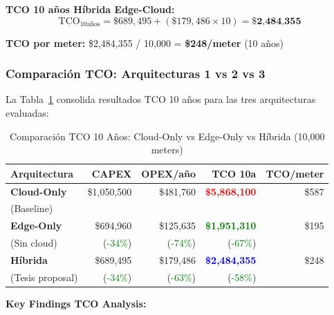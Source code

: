\textbf{TCO 10 años Híbrida Edge-Cloud:}
\begin{equation}
\text{TCO}_{10\text{años}} = \$689,495 + (\$179,486 \times 10) = \textbf{\$2,484,355}
\end{equation}

\textbf{TCO por meter:} \$2,484,355 / 10,000 = \textbf{\$248/meter} (10 años)

\subsubsection{Comparación TCO: Arquitecturas 1 vs 2 vs 3}

La Tabla~\ref{tab:tco-comparison-summary} consolida resultados TCO 10 años para las tres arquitecturas evaluadas:

\begin{table}[H]
\centering
\caption{Comparación TCO 10 Años: Cloud-Only vs Edge-Only vs Híbrida (10,000 meters)}
\label{tab:tco-comparison-summary}
\small
\begin{tabular}{|p{3.5cm}|r|r|r|r|}
\hline
\rowcolor{gray!30}
\textbf{Arquitectura} & \textbf{CAPEX} & \textbf{OPEX/año} & \textbf{TCO 10a} & \textbf{TCO/meter} \\
\hline
\textbf{Cloud-Only} & \$1,050,500 & \$481,760 & \textcolor{red}{\textbf{\$5,868,100}} & \$587 \\
(Baseline) & & & & \\
\hline
\textbf{Edge-Only} & \$694,960 & \$125,635 & \textcolor{green}{\textbf{\$1,951,310}} & \$195 \\
(Sin cloud) & (\textcolor{green}{-34\%}) & (\textcolor{green}{-74\%}) & (\textcolor{green}{-67\%}) & \\
\hline
\textbf{Híbrida} & \$689,495 & \$179,486 & \textcolor{blue}{\textbf{\$2,484,355}} & \$248 \\
(Tesis proposal) & (\textcolor{green}{-34\%}) & (\textcolor{green}{-63\%}) & (\textcolor{green}{-58\%}) & \\
\hline
\end{tabular}
\end{table}

\textbf{Key Findings TCO Analysis:}

